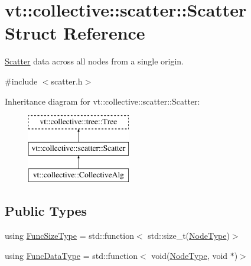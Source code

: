 \hypertarget{structvt_1_1collective_1_1scatter_1_1_scatter}{}\section{vt\+:\+:collective\+:\+:scatter\+:\+:Scatter Struct Reference}
\label{structvt_1_1collective_1_1scatter_1_1_scatter}


\hyperlink{structvt_1_1collective_1_1scatter_1_1_scatter}{Scatter} data across all nodes from a single origin.  




{\ttfamily \#include $<$scatter.\+h$>$}

Inheritance diagram for vt\+:\+:collective\+:\+:scatter\+:\+:Scatter\+:\begin{figure}[H]
\begin{center}
\leavevmode
\includegraphics[height=3.000000cm]{structvt_1_1collective_1_1scatter_1_1_scatter}
\end{center}
\end{figure}
\subsection*{Public Types}
\begin{DoxyCompactItemize}
\item 
using \hyperlink{structvt_1_1collective_1_1scatter_1_1_scatter_a977d895e42999a4078c6705ac851f447}{Func\+Size\+Type} = std\+::function$<$ std\+::size\+\_\+t(\hyperlink{namespacevt_a866da9d0efc19c0a1ce79e9e492f47e2}{Node\+Type})$>$
\item 
using \hyperlink{structvt_1_1collective_1_1scatter_1_1_scatter_a4040244e8ed36afd5d408c27efceea1b}{Func\+Data\+Type} = std\+::function$<$ void(\hyperlink{namespacevt_a866da9d0efc19c0a1ce79e9e492f47e2}{Node\+Type}, void $\ast$)$>$
\end{DoxyCompactItemize}
